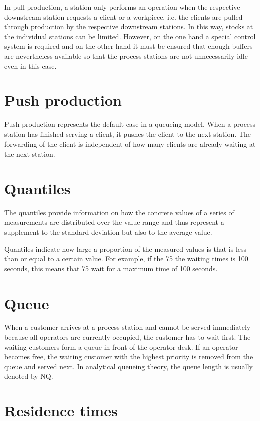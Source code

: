 In pull production, a station only performs an operation when the respective downstream station
requests a client or a workpiece, i.e. the clients are pulled through production by the
respective downstream stations. In this way, stocks at the individual stations can be limited.
However, on the one hand a special control system is required and on the other hand it must be
ensured that enough buffers are nevertheless available so that the process stations are not
unnecessarily idle even in this case.

\section*{Push production}


Push production represents the default case in a queueing model. When a process station has
finished serving a client, it pushes the client to the next station. The forwarding of the
client is independent of how many clients are already waiting at the next station.

\section*{Quantiles}


The quantiles provide information on how the concrete values of a series of measurements
are distributed over the value range and thus represent a supplement to the
standard deviation but also to the
average value.


Quantiles indicate how large a proportion of the measured values is that is
less than or equal to a certain value. For example, if the 75%
the waiting times is 100 seconds, this means that 75%
wait for a maximum time of 100 seconds.

\section*{Queue}


When a customer arrives at a process station and cannot
be served immediately because all operators are currently occupied, the customer has to wait first.
The waiting customers form a queue in front of the operator desk. If an operator becomes free,
the waiting customer with the highest priority is removed from the queue and served next.
In analytical queueing theory, the queue length is usually denoted by NQ.

\section*{Residence times}


